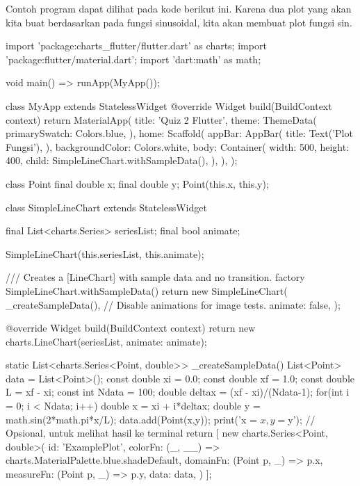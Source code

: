 \documentclass[a4paper,11pt]{article} %
\begin{document}
Contoh program dapat dilihat pada kode berikut ini. Karena dua plot yang akan kita buat
berdasarkan pada fungsi sinusoidal, kita akan membuat plot fungsi sin.
\begin{dartcode}
import 'package:charts_flutter/flutter.dart' as charts;
import 'package:flutter/material.dart';
import 'dart:math' as math;
  
void main() => runApp(MyApp());

class MyApp extends StatelessWidget {
  @override
  Widget build(BuildContext context) {
    return MaterialApp(
      title: 'Quiz 2 Flutter',
      theme: ThemeData(
        primarySwatch: Colors.blue,
      ),
      home: Scaffold(
        appBar: AppBar(
          title: Text('Plot Fungsi'),
        ),
        backgroundColor: Colors.white,
        body: Container(
          width: 500,
          height: 400,
          child: SimpleLineChart.withSampleData(),
        ),
      ),
    );
  }
}

class Point {
  final double x;
  final double y;
  Point(this.x, this.y);
}

class SimpleLineChart extends StatelessWidget {
  final List<charts.Series> seriesList;
  final bool animate;

  SimpleLineChart(this.seriesList, {this.animate});

  /// Creates a [LineChart] with sample data and no transition.
  factory SimpleLineChart.withSampleData() {
    return new SimpleLineChart(
      _createSampleData(),
      // Disable animations for image tests.
      animate: false,
    );
  }

  @override
  Widget build(BuildContext context) {
    return new charts.LineChart(seriesList, animate: animate);
  }

  static List<charts.Series<Point, double>> _createSampleData() {
    List<Point> data = List<Point>();
    const double xi = 0.0;
    const double xf = 1.0;
    const double L = xf - xi;
    const int Ndata = 100;
    double deltax = (xf - xi)/(Ndata-1);
    for(int i = 0; i < Ndata; i++) {
      double x = xi + i*deltax;
      double y = math.sin(2*math.pi*x/L);
      data.add(Point(x,y));
      print('x = $x, y = $y'); // Opsional, untuk melihat hasil ke terminal
    }
    return [
      new charts.Series<Point, double>(
        id: 'ExamplePlot',
        colorFn: (_, __) => charts.MaterialPalette.blue.shadeDefault,
        domainFn: (Point p, _) => p.x,
        measureFn: (Point p, _) => p.y,
        data: data,
      )
    ];
  }
}
\end{dartcode}
\end{document}
